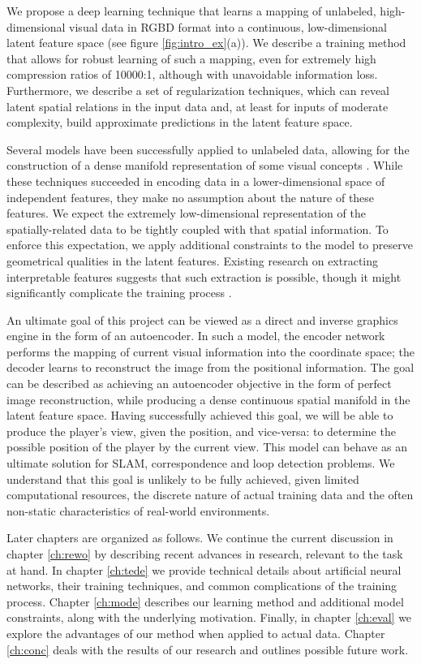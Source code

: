 We propose a deep learning technique that learns a mapping of unlabeled, high-dimensional visual data in RGBD format into a continuous, low-dimensional latent feature space (see figure \ref{fig:intro_ex}(a)). We describe a training method that allows for robust learning of such a mapping, even for extremely high compression ratios of 10000:1, although with unavoidable information loss. Furthermore, we describe a set of regularization techniques, which can reveal latent spatial relations in the input data and, at least for inputs of moderate complexity, build approximate predictions in the latent feature space.

Several models have been successfully applied to unlabeled data, allowing for the construction of a dense manifold representation of some visual concepts \cite{Li2015, Kingma2013, Goodfellow2014}.
While these techniques succeeded in encoding data in a lower-dimensional space of independent features, they make no assumption about the nature of these features.
We expect the extremely low-dimensional representation of the spatially-related data to be tightly coupled with that spatial information.
To enforce this expectation, we apply additional constraints to the model to preserve geometrical qualities in the latent features.
Existing research on extracting interpretable features suggests that such extraction is possible, though it might significantly complicate the training process \cite{Lei2016, Kulkarni2015}.

An ultimate goal of this project can be viewed as a direct and inverse graphics engine in the form of an autoencoder. In such a model, the encoder network performs the mapping of current visual information into the coordinate space; the decoder learns to reconstruct the image from the positional information.
The goal can be described as achieving an autoencoder objective in the form of perfect image reconstruction, while producing a dense continuous spatial manifold in the latent feature space.
Having successfully achieved this goal, we will be able to produce the player's view, given the position, and vice-versa: to determine the possible position of the player by the current view.
This model can behave as an ultimate solution for SLAM, correspondence and loop detection problems.
We understand that this goal is unlikely to be fully achieved, given limited computational resources, the discrete nature of actual training data and the often non-static characteristics of real-world environments.

Later chapters are organized as follows.
We continue the current discussion in chapter \ref{ch:rewo} by describing recent advances in research, relevant to the task at hand.
In chapter \ref{ch:tede} we provide technical details about artificial neural networks, their training techniques, and common complications of the training process.
Chapter \ref{ch:mode} describes our learning method and additional model constraints, along with the underlying motivation.
Finally, in chapter \ref{ch:eval} we explore the advantages of our method when applied to actual data.
Chapter \ref{ch:conc} deals with the results of our research and outlines possible future work.
